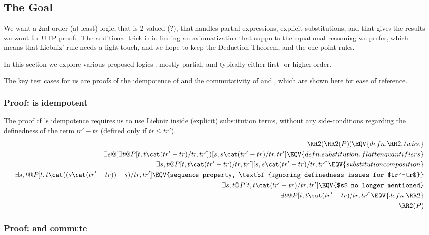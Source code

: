 \subsection{The Goal}

We want a 2nd-order (at least) logic,
that is 2-valued (?),
that handles partial expressions, explicit substitutions,
and that gives
the results we want for UTP proofs.
The additional trick is in finding an axiomatization that supports
the equational reasoning we prefer, which means that Liebniz' rule
needs a light touch, and we hope to keep the Deduction Theorem,
and the one-point rules.

In this section we explore various proposed logics%
\cite{Prawitz56,Farmer90,Owe93,JM94,Feferman95,MB98,CMR99},
mostly partial, and typically either first- or higher-order.



The key test cases for us are proofs of the idempotence
of  and the commutativity of  and ,
which are shown here for ease of reference.

\newpage
\subsubsection{Proof:  is idempotent}

The proof of 's idempotence requires us to
use Liebniz inside (explicit) substitution terms,
without any side-conditions regarding the definedness
of the term $tr'-tr$ (defined only if $tr \le tr'$).
\begin{eqnarray*}
  && \RR2(\RR2(P))
\EQV{defn. \RR2, twice}
\\&& \exists s @
      (\exists t @ P[t,t\cat(tr'-tr)/tr,tr'])
      [s,s\cat(tr'-tr)/tr,tr']
\EQV{defn. substitution, flatten quantifiers}
\\&& \exists s,t @
      P[t,t\cat(tr'-tr)/tr,tr'][s,s\cat(tr'-tr)/tr,tr']
\EQV{substitution composition}
\\&& \exists s,t @
      P[t,t\cat((s\cat(tr'-tr))-s)/tr,tr']
\EQV{sequence property, \textbf{ignoring definedness issues for $tr'-tr$}}
\\&& \exists s,t @ P[t,t\cat(tr'-tr)/tr,tr']
\EQV{$s$ no longer mentioned}
\\&& \exists t @ P[t,t\cat(tr'-tr)/tr,tr']
\EQV{defn. \RR2}
\\&& \RR2(P)
\end{eqnarray*}

\subsubsection{Proof:  and  commute}

